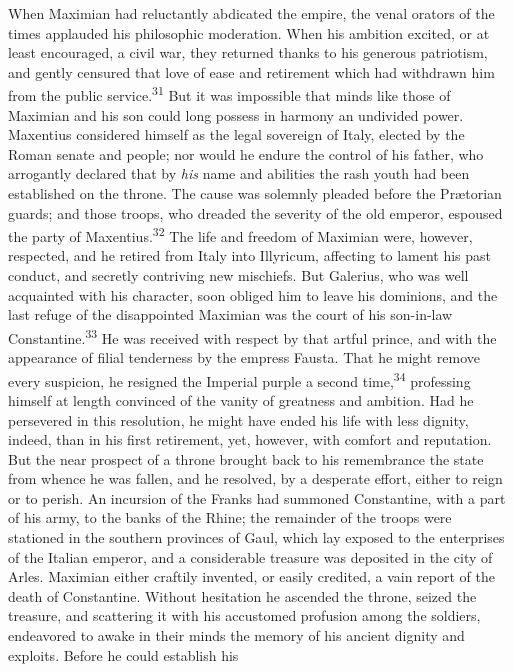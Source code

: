 When Maximian had reluctantly abdicated the empire, the venal
orators of the times applauded his philosophic moderation. When
his ambition excited, or at least encouraged, a civil war, they
returned thanks to his generous patriotism, and gently censured
that love of ease and retirement which had withdrawn him from the
public service.\textsuperscript{31} But it was impossible that minds like those of
Maximian and his son could long possess in harmony an undivided
power. Maxentius considered himself as the legal sovereign of
Italy, elected by the Roman senate and people; nor would he
endure the control of his father, who arrogantly declared that by
\textit{his} name and abilities the rash youth had been established on
the throne. The cause was solemnly pleaded before the Prætorian
guards; and those troops, who dreaded the severity of the old
emperor, espoused the party of Maxentius.\textsuperscript{32} The life and freedom
of Maximian were, however, respected, and he retired from Italy
into Illyricum, affecting to lament his past conduct, and
secretly contriving new mischiefs. But Galerius, who was well
acquainted with his character, soon obliged him to leave his
dominions, and the last refuge of the disappointed Maximian was
the court of his son-in-law Constantine.\textsuperscript{33} He was received with
respect by that artful prince, and with the appearance of filial
tenderness by the empress Fausta. That he might remove every
suspicion, he resigned the Imperial purple a second time,\textsuperscript{34}
professing himself at length convinced of the vanity of greatness
and ambition. Had he persevered in this resolution, he might have
ended his life with less dignity, indeed, than in his first
retirement, yet, however, with comfort and reputation. But the
near prospect of a throne brought back to his remembrance the
state from whence he was fallen, and he resolved, by a desperate
effort, either to reign or to perish. An incursion of the Franks
had summoned Constantine, with a part of his army, to the banks
of the Rhine; the remainder of the troops were stationed in the
southern provinces of Gaul, which lay exposed to the enterprises
of the Italian emperor, and a considerable treasure was deposited
in the city of Arles. Maximian either craftily invented, or
easily credited, a vain report of the death of Constantine.
Without hesitation he ascended the throne, seized the treasure,
and scattering it with his accustomed profusion among the
soldiers, endeavored to awake in their minds the memory of his
ancient dignity and exploits. Before he could establish his
